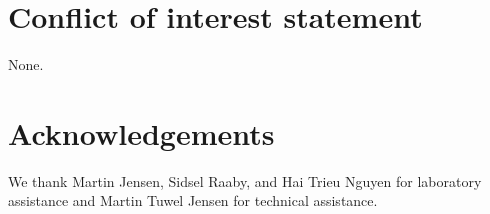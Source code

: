 \documentclass[preprint,5p,times,11pt]{elsarticle}
\begin{document}
\section{Conflict of interest statement}
None.



\section{Acknowledgements}
We thank Martin Jensen, Sidsel Raaby, and Hai Trieu Nguyen for laboratory assistance and Martin Tuwel Jensen for technical assistance.





 




%
\end{document}
